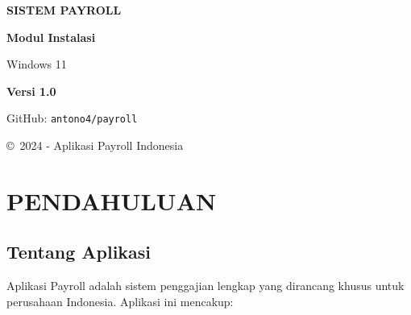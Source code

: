 \documentclass[12pt,a4paper]{article}
\begin{document}
\begin{titlepage}
    \centering
    \vspace*{2cm}
    
    \begin{center}
        \textbf{\LARGE SISTEM PAYROLL}
    \end{center}
    
    \vspace{1cm}
    
    {\Huge{}\textbf{Modul Instalasi}}
    \vspace{0.5cm}
    
    {\Large Windows 11}
    \vspace{2cm}
    
    \begin{center}
    \end{center}
    
    \vspace{3cm}
    
    {\Large{}\textbf{Versi 1.0}}
    \vspace{1cm}
    
    {\large GitHub: \texttt{antono4/payroll}}
    
    \vspace{2cm}
    
    \copyright\ 2024 - Aplikasi Payroll Indonesia
    
\end{titlepage}

\newpage
\tableofcontents
\newpage

\section{PENDAHULUAN}

\subsection{Tentang Aplikasi}
Aplikasi Payroll adalah sistem penggajian lengkap yang dirancang khusus untuk perusahaan Indonesia. Aplikasi ini mencakup:
\end{document}
